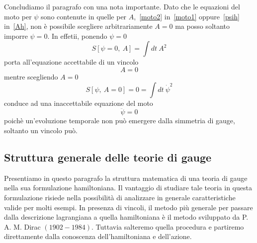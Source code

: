     \hfill

    Concludiamo il paragrafo con una nota importante. Dato che le equazioni del moto per $\psi$ sono contenute in quelle per $A$,~\eqref{moto2} in~\eqref{moto1} oppure~\eqref{psih} in~\eqref{Ah}, non è possibile scegliere arbitrariamente $A = 0$ ma posso soltanto imporre $\psi = 0$. In effetii, ponendo $\psi = 0$ 
    \begin{equation*}
        S[\psi = 0,~A] = \int dt ~ A^2
    \end{equation*}
    porta all'equazione accettabile di un vincolo
    \begin{equation*}
        A = 0
    \end{equation*}
    mentre scegliendo $A = 0$ 
    \begin{equation*}
        S[\psi,~A=0]=0 = \int dt ~\dot \psi^2
    \end{equation*}
    conduce ad una inaccettabile equazione del moto 
    \begin{equation*}
        \ddot \psi = 0
    \end{equation*}
    poichè un'evoluzione temporale non può emergere dalla simmetria di gauge, soltanto un vincolo può.

\subsection{Struttura generale delle teorie di gauge} 

    Presentiamo in questo paragrafo la struttura matematica di una teoria di gauge nella sua formulazione hamiltoniana. Il vantaggio di studiare tale teoria in questa formulazione risiede nella possibilità di analizzare in generale caratteristiche valide per molti esempi. In presenza di vincoli, il metodo più generale per passare dalla descrizione lagrangiana a quella hamiltoniana è il metodo sviluppato da P. A. M. Dirac $(1902- 1984)$. Tuttavia salteremo quella procedura e partiremo direttamente dalla conoscenza dell'hamiltoniana e dell'azione. 
    
